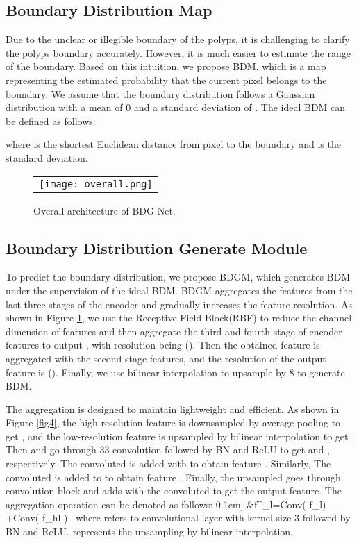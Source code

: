\documentclass[]{spie}
\begin{document}
\subsection{Boundary Distribution Map}
\label{sec:BDM}

Due to the unclear or illegible boundary of the polyps, it is challenging to clarify the polyps boundary accurately. However, it is much easier to estimate the range of the boundary. Based on this intuition, we propose BDM, which is a map representing the estimated probability that the current pixel belongs to the boundary. We assume that the boundary distribution follows a Gaussian distribution with a mean of 0 and a standard deviation of . The ideal BDM can be defined as follows:



\noindent where  is the shortest Euclidean distance from pixel  to the boundary and  is the standard deviation.



   
\begin{figure} [ht]
\begin{center}
\begin{tabular}{c} \texttt{[image: overall.png]}
\end{tabular}
\end{center}
\caption[example]
{ \label{fig2} 
Overall architecture of BDG-Net.}
\end{figure}


\subsection{Boundary Distribution Generate Module}

To predict the boundary distribution, we propose BDGM, which generates BDM under the supervision of the ideal BDM. BDGM aggregates the features from the last three stages of the encoder and gradually increases the feature resolution. As shown in Figure \ref{fig2}, we use the Receptive Field Block\cite{liu2018receptive}(RBF) to reduce the channel dimension of features and then aggregate the third and fourth-stage of encoder features to output , with resolution being (). Then the obtained feature  is aggregated with the second-stage features, and the resolution of the output feature  is (). Finally, we use bilinear interpolation to upsample by 8 to generate BDM.

The aggregation is designed to maintain lightweight and eﬃcient. As shown in Figure \ref{fig4}, the high-resolution feature  is downsampled by average pooling to get , and the low-resolution feature  is upsampled by bilinear interpolation to get . Then  and  go through 33 convolution followed by BN and ReLU to get  and , respectively. The convoluted  is added with  to obtain feature . Similarly, The convoluted  is added to  to obtain feature . Finally, the upsampled  goes through convolution block and adds with the convoluted  to get the output feature. The aggregation operation can be denoted as follows:
0.1cm]
    &f^{\prime }_{l}=Conv\left( f_{l}\right)  +Conv\left( f_{hl}  \right)
    \label{eq3}\
\noindent where  refers to convolutional layer with kernel size 3 followed by BN and ReLU.  represents the upsampling by bilinear interpolation.
\end{document}
